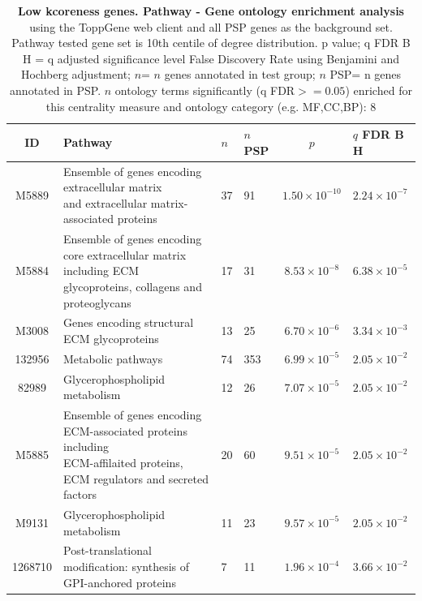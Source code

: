 \begin{table}[ht]
\centering
\begin{adjustbox}{width=\textwidth}
\setlength{\extrarowheight}{2pt}
\begin{tabular}{@{}clllcl@{}}
  \toprule
  ID & Pathway & $n$ & $n$ PSP & $p$ & $q$ FDR B H \\ 

  \midrule
M5889 & \makecell{Ensemble of genes encoding extracellular matrix\\ and extracellular matrix-associated proteins}  & 37 & 91 & $1.50 \times 10^{-10}$ & $2.24 \times 10^{-7}$ \\ 
  M5884 & \makecell{Ensemble of genes encoding core extracellular matrix\\ including ECM glycoproteins, collagens and proteoglycans} & 17 & 31 & $8.53 \times 10^{-8}$ & $6.38 \times 10^{-5}$ \\ 
  M3008 & Genes encoding structural ECM glycoproteins & 13 & 25 & $6.70 \times 10^{-6}$ & $3.34 \times 10^{-3}$ \\ 
  132956 & Metabolic pathways & 74 & 353 & $6.99 \times 10^{-5}$ & $2.05 \times 10^{-2}$ \\ 
  82989 & Glycerophospholipid metabolism & 12 & 26 & $7.07 \times 10^{-5}$ & $2.05 \times 10^{-2}$ \\ 
  M5885 & \makecell{Ensemble of genes encoding ECM-associated proteins including\\ ECM-affilaited proteins, ECM regulators and secreted factors} & 20 & 60 & $9.51 \times 10^{-5}$ & $2.05 \times 10^{-2}$ \\ 
  M9131 & Glycerophospholipid metabolism & 11 & 23 & $9.57 \times 10^{-5}$ & $2.05 \times 10^{-2}$ \\ 
  1268710 & Post-translational modification: synthesis of GPI-anchored proteins & 7 & 11 & $1.96 \times 10^{-4}$ & $3.66 \times 10^{-2}$ \\ 
   \hline
\end{tabular}
\end{adjustbox}
\caption[Gene ontology enrichment Low kcoreness genes Pathway of genes above 90th centile of distribution]{\textbf{Low kcoreness genes. Pathway - Gene ontology enrichment analysis} using the ToppGene web client and all PSP genes as the background set.  Pathway tested gene set is 10th centile of degree distribution.  p value; q FDR B H = q adjusted significance level False Discovery Rate using Benjamini and Hochberg adjustment; $n$= $n$ genes annotated in test group; $n$ PSP= n genes annotated in PSP. $n$ ontology terms significantly (q FDR$>=0.05$) enriched for this centrality measure and ontology category (e.g. MF,CC,BP): 8} 
\label{tab:ToppGENE Pathway. kco 10 centile cwpsp.txtp = p value; q FDR B H = q adjusted significance level False Discovery Rate using Benjamini and Hochberg adjustment; n= n genes annotated in test group; n PSP= n genes annotated in PSP. n significant in category 8}
\end{table}
